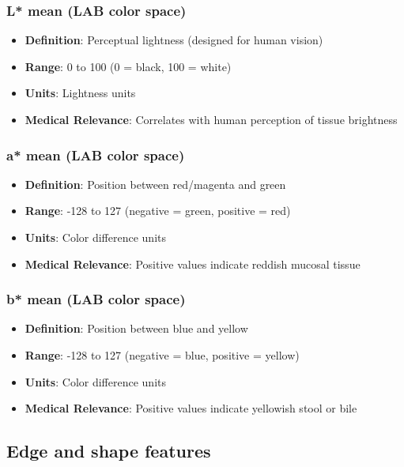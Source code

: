\documentclass[11pt]{article}
\begin{document}
\subsubsection{L* mean (LAB color space)}
\begin{itemize}
    \item \textbf{Definition}: Perceptual lightness (designed for human vision)
    \item \textbf{Range}: 0 to 100 (0 = black, 100 = white)
    \item \textbf{Units}: Lightness units
    \item \textbf{Medical Relevance}: Correlates with human perception of tissue brightness
\end{itemize}

\subsubsection{a* mean (LAB color space)}
\begin{itemize}
    \item \textbf{Definition}: Position between red/magenta and green
    \item \textbf{Range}: -128 to 127 (negative = green, positive = red)
    \item \textbf{Units}: Color difference units
    \item \textbf{Medical Relevance}: Positive values indicate reddish mucosal tissue
\end{itemize}

\subsubsection{b* mean (LAB color space)}
\begin{itemize}
    \item \textbf{Definition}: Position between blue and yellow
    \item \textbf{Range}: -128 to 127 (negative = blue, positive = yellow)
    \item \textbf{Units}: Color difference units
    \item \textbf{Medical Relevance}: Positive values indicate yellowish stool or bile
\end{itemize}

\subsection{Edge and shape features}
\end{document}
